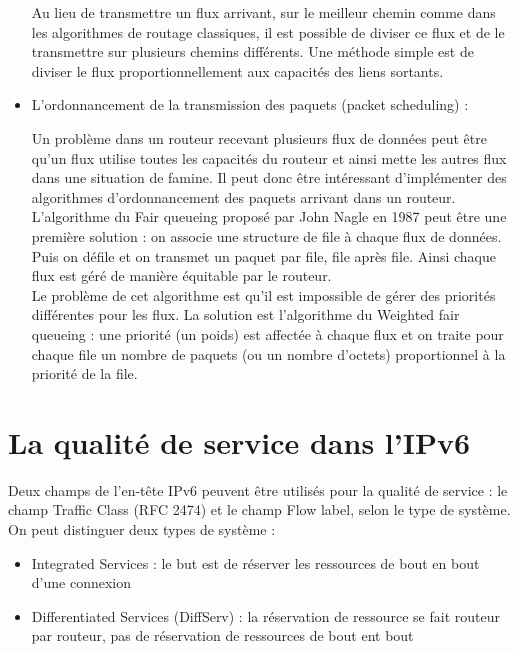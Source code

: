 \begin{itemize}
Au lieu de transmettre un flux arrivant, sur le meilleur chemin comme dans les algorithmes de routage classiques, il est possible de diviser ce flux et de le transmettre sur plusieurs chemins différents. Une méthode simple est de diviser le flux proportionnellement aux capacités des liens sortants.\\

\item L'ordonnancement de la transmission des paquets (packet scheduling) :

Un problème dans un routeur recevant plusieurs flux de données peut être qu'un flux utilise toutes les capacités du routeur et ainsi mette les autres flux dans une situation de famine. Il peut donc être intéressant d'implémenter des algorithmes d'ordonnancement des paquets arrivant dans un routeur.\\
L'algorithme du Fair queueing proposé par John Nagle en 1987 peut être une première solution : on associe une structure de file à chaque flux de données. Puis on défile et on transmet un paquet par file, file après file. Ainsi chaque flux est géré de manière équitable par le routeur.\\
Le problème de cet algorithme est qu'il est impossible de gérer des priorités différentes pour les flux. La solution est l'algorithme du Weighted fair queueing : une priorité (un poids) est affectée à chaque flux et on traite pour chaque file un nombre de paquets (ou un nombre d'octets) proportionnel à la priorité de la file.

\end{itemize}


    
\section{La qualité de service dans l'IPv6 \cite{Archier2012}}

Deux champs de l'en-tête IPv6 peuvent être utilisés pour la qualité de service : le champ Traffic Class (RFC 2474) et le champ Flow label, selon le type de système.
On peut distinguer deux types de système :
\begin{itemize}
\item Integrated Services : le but est de réserver les ressources de bout en bout d'une connexion
\item Differentiated Services (DiffServ) : la réservation de ressource se fait routeur par routeur, pas de réservation de ressources de bout ent bout
\end{itemize}

